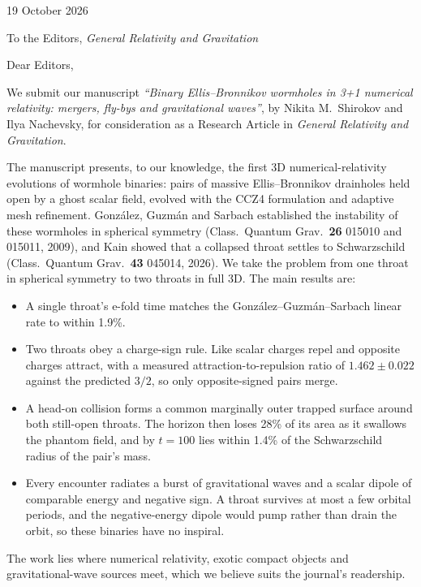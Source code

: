 \documentclass[11pt]{article}
\begin{document}
\begin{flushright}
19 October 2026
\end{flushright}

To the Editors, \emph{General Relativity and Gravitation}

Dear Editors,

We submit our manuscript \emph{``Binary Ellis--Bronnikov wormholes in 3+1 numerical relativity: mergers, fly-bys and gravitational waves''}, by Nikita M.\ Shirokov and Ilya Nachevsky, for consideration as a Research Article in \emph{General Relativity and Gravitation}.

The manuscript presents, to our knowledge, the first 3D numerical-relativity evolutions of wormhole binaries: pairs of massive Ellis--Bronnikov drainholes held open by a ghost scalar field, evolved with the CCZ4 formulation and adaptive mesh refinement. Gonz\'alez, Guzm\'an and Sarbach established the instability of these wormholes in spherical symmetry (Class.\ Quantum Grav.\ \textbf{26} 015010 and 015011, 2009), and Kain showed that a collapsed throat settles to Schwarzschild (Class.\ Quantum Grav.\ \textbf{43} 045014, 2026). We take the problem from one throat in spherical symmetry to two throats in full 3D. The main results are:

\begin{itemize}\setlength{\itemsep}{0.2em}
\item A single throat's e-fold time matches the Gonz\'alez--Guzm\'an--Sarbach linear rate to within 1.9\%.
\item Two throats obey a charge-sign rule. Like scalar charges repel and opposite charges attract, with a measured attraction-to-repulsion ratio of $1.462\pm0.022$ against the predicted $3/2$, so only opposite-signed pairs merge.
\item A head-on collision forms a common marginally outer trapped surface around both still-open throats. The horizon then loses 28\% of its area as it swallows the phantom field, and by $t=100$ lies within 1.4\% of the Schwarzschild radius of the pair's mass.
\item Every encounter radiates a burst of gravitational waves and a scalar dipole of comparable energy and negative sign. A throat survives at most a few orbital periods, and the negative-energy dipole would pump rather than drain the orbit, so these binaries have no inspiral.
\end{itemize}

The work lies where numerical relativity, exotic compact objects and gravitational-wave sources meet, which we believe suits the journal's readership.
\end{document}
